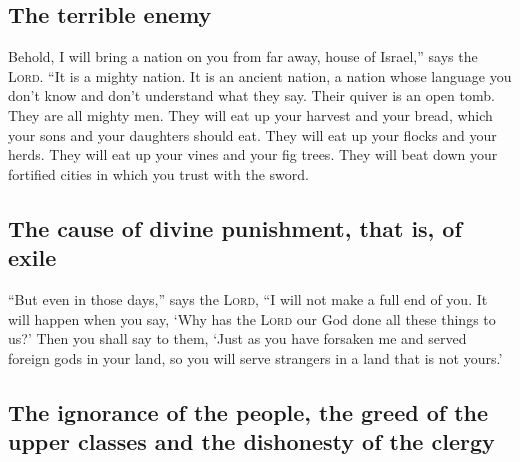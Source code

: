 \hypertarget{the-terrible-enemy}{%
\subsection{The terrible enemy}\label{the-terrible-enemy}}

 Behold, I will bring a nation on you from far away,
house of Israel,'' says the \textsc{Lord}. ``It is a mighty nation. It
is an ancient nation, a nation whose language you don't know and don't
understand what they say.  Their quiver is an open tomb.
They are all mighty men.  They will eat up your harvest
and your bread, which your sons and your daughters should eat. They will
eat up your flocks and your herds. They will eat up your vines and your
fig trees. They will beat down your fortified cities in which you trust
with the sword.

\hypertarget{the-cause-of-divine-punishment-that-is-of-exile}{%
\subsection{The cause of divine punishment, that is, of
exile}\label{the-cause-of-divine-punishment-that-is-of-exile}}

 ``But even in those days,'' says the \textsc{Lord}, ``I
will not make a full end of you.  It will happen when you
say, `Why has the \textsc{Lord} our God done all these things to us?'
Then you shall say to them, `Just as you have forsaken me and served
foreign gods in your land, so you will serve strangers in a land that is
not yours.'

\hypertarget{the-ignorance-of-the-people-the-greed-of-the-upper-classes-and-the-dishonesty-of-the-clergy}{%
\subsection{The ignorance of the people, the greed of the upper classes
and the dishonesty of the
clergy}\label{the-ignorance-of-the-people-the-greed-of-the-upper-classes-and-the-dishonesty-of-the-clergy}}

